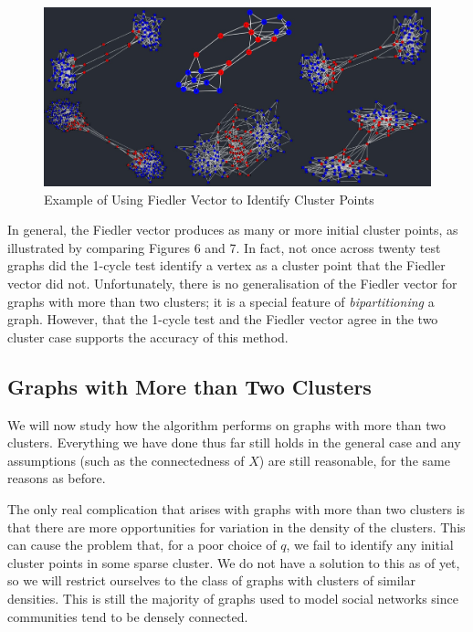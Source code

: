 \documentclass[12pt,a4paper]{amsart}
\numberwithin{equation}{section}
\theoremstyle{plain}
\theoremstyle{definition}
\begin{document}
\begin{figure}[h]
	\centering
	\caption{Example of Using Fiedler Vector to Identify Cluster Points}
	\includegraphics[scale=0.55]{FiedlerClusterPoints.jpg}
\end{figure}

\newpage

In general, the Fiedler vector produces as many or more initial cluster points, as illustrated by comparing Figures 6 and 7. In fact, not once across twenty test graphs did the 1-cycle test identify a vertex as a cluster point that the Fiedler vector did not. Unfortunately, there is no generalisation of the Fiedler vector for graphs with more than two clusters; it is a special feature of \textit{bipartitioning} a graph. However, that the 1-cycle test and the Fiedler vector agree in the two cluster case supports the accuracy of this method.

\subsection{Graphs with More than Two Clusters}

We will now study how the algorithm performs on graphs with more than two clusters. Everything we have done thus far still holds in the general case and any assumptions (such as the connectedness of $X$) are still reasonable, for the same reasons as before.

The only real complication that arises with graphs with more than two clusters is that there are more opportunities for variation in the density of the clusters. This can cause the problem that, for a poor choice of $q$, we fail to identify any initial cluster points in some sparse cluster. We do not have a solution to this as of yet, so we will restrict ourselves to the class of graphs with clusters of similar densities. This is still the majority of graphs used to model social networks since communities tend to be densely connected.
\end{document}

